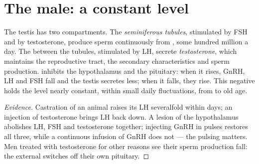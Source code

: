 \section{The male: a constant level}

\begin{proposition}\label{prop:g11:hormones-and-reproduction:male}
The testis has two compartments. The \emph{seminiferous tubules},
stimulated by FSH and by testosterone, produce sperm continuously
from , some hundred million a day. The  between the
tubules, stimulated by LH, secrete \emph{testosterone}, which
maintains the reproductive tract, the secondary characteristics and
sperm production.  inhibits the hypothalamus and the
pituitary: when it rises, GnRH, LH and FSH fall and the testis
secretes less; when it falls, they rise. This negative  holds
the level nearly constant, within small daily fluctuations, from
 to old age.
\end{proposition}
\begin{proof}[Evidence]
Castration of an animal raises its LH severalfold within days; an
injection of testosterone brings LH back down. A lesion of the
hypothalamus abolishes LH, FSH and testosterone together; injecting
GnRH in pulses restores all three, while a continuous infusion of GnRH
does not --- the pulsing matters. Men treated with testosterone for
other reasons see their sperm production fall: the external 
switches off their own pituitary.
\end{proof}

